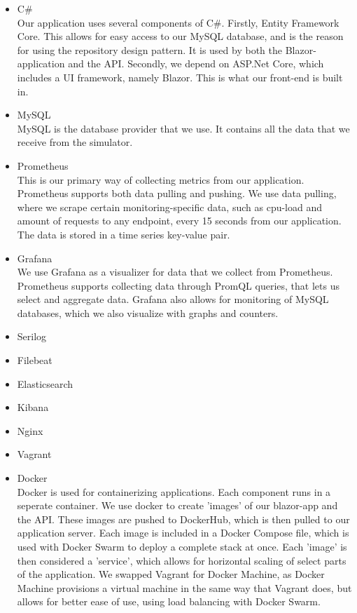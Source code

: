 \documentclass{article}
\begin{document}
\begin{itemize}
	\item C\#\\
	Our application uses several components of C\#. Firstly, Entity Framework Core. This allows for easy access to our MySQL database, and is the reason for using the repository design pattern. It is used by both the Blazor-application and the API. Secondly, we depend on ASP.Net Core, which includes a UI framework, namely Blazor. This is what our front-end is built in.
	\item MySQL\\
	MySQL is the database provider that we use. It contains all the data that we receive from the simulator.
	\item Prometheus\\
	This is our primary way of collecting metrics from our application. Prometheus supports both data pulling and pushing. We use data pulling, where we scrape certain monitoring-specific data, such as cpu-load and amount of requests to any endpoint, every 15 seconds from our application. The data is stored in a time series key-value pair.
	
 	\item Grafana\\
 	We use Grafana as a visualizer for data that we collect from Prometheus. Prometheus supports collecting data through PromQL queries, that lets us select and aggregate data. Grafana also allows for monitoring of MySQL databases, which we also visualize with graphs and counters.
 	
 	\item Serilog\\
 	\item Filebeat\\
 	\item Elasticsearch\\
 	\item Kibana\\
 	\item Nginx\\
 	\item Vagrant\\
 	\item Docker\\
 	Docker is used for containerizing applications. Each component runs in a seperate container. We use docker to create 'images' of our blazor-app and the API. These images are pushed to DockerHub, which is then pulled to our application server. Each image is included in a Docker Compose file, which is used with Docker Swarm to deploy a complete stack at once. Each 'image' is then considered a 'service', which allows for horizontal scaling of select parts of the application. We swapped Vagrant for Docker Machine, as Docker Machine provisions a virtual machine in the same way that Vagrant does, but allows for better ease of use, using load balancing with Docker Swarm.
 	

\end{itemize}
\end{document}
